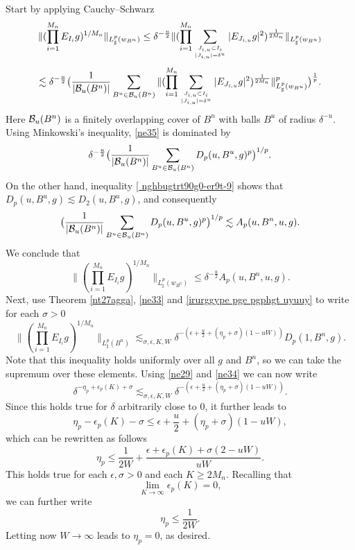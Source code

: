\documentclass[amssymb,amsfonts,12pt]{amsart}
\begin{document}
Start by applying Cauchy--Schwarz
$$
\|(\prod_{i=1}^{M_n}E_{I_i}g)^{1/M_n}\|_{L^{p}_{\sharp}(w_{B^n})}\le \delta^{-\frac{u}2}\|(\prod_{i=1}^{M_n}\sum_{J_{i,u}\subset I_i\atop{|J_{i,u}|=\delta^{u}}}|E_{J_{i,u}}g|^2)^{\frac1{2M_n}}\|_{L^{p}_{\sharp}(w_{B^n})}$$
\begin{equation}
\label{ne35}
\lesssim \delta^{-\frac{u}2}\big(\frac1{|{\mathcal B}_u(B^n)|}\sum_{B^u\in{\mathcal B}_u(B^n)}\|(\prod_{i=1}^{M_n}\sum_{J_{i,u}\subset I_i\atop{|J_{i,u}|=\delta^{u}}}|E_{J_{i,u}}g|^2)^{\frac1{2M_n}}\|_{L^{p}_{\sharp}(w_{B^u})}^p\big )^{\frac1p}.
\end{equation}
Here ${\mathcal B}_u(B^n)$ is a finitely overlapping cover of $B^n$ with balls $B^u$ of radius $\delta^{-u}$.
Using Minkowski's inequality, \eqref{ne35} is dominated by $$\delta^{-\frac{u}2}\big(\frac1{|{\mathcal B}_u(B^n)|}\sum_{B^u\in{\mathcal B}_u(B^n)}D_p(u,B^u,g)^p\big)^{1/p}.$$ On the other hand, inequality \eqref{ nghbugtrt90g0-er9t-9} shows that $D_p(u,B^u,g)\lesssim D_2(u,B^u,g)$, and consequently
$$\big(\frac1{|{\mathcal B}_u(B^n)|}\sum_{B^u\in{\mathcal B}_u(B^n)}D_p(u,B^u,g)^p\big)^{1/p}\lesssim A_p(u,B^n,u,g).$$
We conclude that
\begin{equation}
\label{irurggype pge pgphgt  uyuuy}
\|(\prod_{i=1}^{M_n}E_{I_i}g)^{1/M_n}\|_{L^{p}_{\sharp}(w_{B^n})}\le \delta^{-\frac{u}2}A_p(u,B^n,u,g).\end{equation}
Next, use Theorem \ref{nt27agga}, \eqref{ne33} and \eqref{irurggype pge pgphgt  uyuuy} to write for each $\sigma>0$
$$\|(\prod_{i=1}^{M_n}E_{I_i}g)^{1/M_n}\|_{L^{p}_{\sharp}(B^n)}\lesssim_{\sigma,\epsilon,K,W}\delta^{-(\epsilon+\frac{u}{2}+(\eta_p+\sigma)(1-uW))}D_p(1,B^n,g).$$
Note that this inequality holds uniformly over  all $g$ and $B^n$, so we can take the supremum over these elements.  Using \eqref{ne29} and \eqref{ne34} we can now write
$$
\delta^{-\eta_p+\epsilon_p(K)+\sigma}\lesssim_{\sigma,\epsilon,K,W}\delta^{-(\epsilon+\frac{u}{2}+(\eta_p+\sigma)(1-uW))}.
$$
Since this holds true for $\delta$ arbitrarily close to $0$, it further leads to
\begin{equation*}\label{ne37}
\eta_p-\epsilon_p(K)-\sigma\le \epsilon+\frac{u}{2}+(\eta_p+\sigma)(1-uW),\end{equation*}
which can be rewritten as follows
$$\eta_p\le \frac{1}{2W}+\frac{\epsilon+\epsilon_p(K)+\sigma(2-uW)}{uW}.$$
This holds true for each $\epsilon,\sigma>0$ and each $K\ge 2M_n$. Recalling that
$$\lim_{K\to\infty}\epsilon_p(K)=0,$$ we can further write
$$\eta_p\le \frac{1}{2W}.$$
Letting now $W\to\infty$ leads to $\eta_p=0$, as desired.
\bigskip
\end{document}
